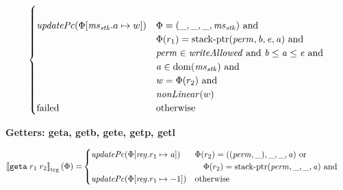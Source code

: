 \documentclass[a4paper]{article}
\newcommand{\sem}[1]{\left\llbracket #1 \right\rrbracket}
\newcommand{\tsem}[2][\Phi]{\sem{#2}_{\mathrm{trg}}(#1)}
\newcommand{\dom}{\mathrm{dom}}
\newcommand{\tand}{\text{ and }}
\newcommand{\totherwise}{\text{otherwise }}
\newcommand{\targetcolor}[1]{\color{black}}
\newcommand{\trg}[1]{{\targetcolor{} #1}}
\newcommand{\zinstr}[1]{\texttt{#1}}
\newcommand{\twoinstr}[3]{
  \ifthenelse{\equal{#2#3}{}}
  {\zinstr{#1}}
  {\zinstr{#1} \; #2 \; #3}
}
\newcommand{\tgeta}[2]{\twoinstr{\trg{geta}}{#1}{#2}}
\newcommand{\update}[2]{[#1 \mapsto #2]}
\newcommand{\updReg}[2]{\update{\reg.#1}{#2}}
\newcommand{\perm}{\var{perm}}
\newcommand{\stkptr}[1]{\mathrm{stack\text{-}ptr}(#1)}
\newcommand{\failed}{\mathrm{failed}}
\newcommand{\var}[1]{\mathit{#1}}
\newcommand{\reg}{\var{reg}}
\newcommand{\ms}{\var{ms}}
\newcommand{\stk}{\var{stk}}
\newcommand{\baddr}{\var{b}}
\newcommand{\eaddr}{\var{e}}
\newcommand{\aaddr}{\var{a}}
\newcommand{\plainfun}[2]{
  \ifthenelse{\equal{#2}{}}
  {\mathit{#1}}
  {\mathit{#1}(#2)}
}
\newcommand{\updPcAddr}[1]{\plainfun{updatePc}{#1}}
\newcommand{\writeAllowed}[1]{\plainfun{writeAllowed}{#1}}
\newcommand{\nonLinear}[1]{\plainfun{nonLinear}{#1}}
\begin{document}
\begin{align*}
\begin{cases}
\begin{array}[t]{l}
                                 \end{array} \\
                                 \updPcAddr{\Phi\update{\ms_\stk.a}{w}} & 
                                 \arraycolsep=0pt
                                 \begin{array}[t]{l}
                                   \Phi = (\_, \_, \_, \ms_\stk) \tand \\
                                   \Phi(r_1) = \stkptr{\perm,\baddr,\eaddr,\aaddr} \tand \\
                                   \perm \in \writeAllowed{} \tand \baddr \leq \aaddr \leq \eaddr \tand \\
                                   \aaddr \in \dom(\ms_\stk) \tand \\
                                   \var{w} = \Phi(r_2) \tand \\
                                   \nonLinear{w}
                                 \end{array} \\
                                 \failed & \totherwise
                               \end{cases}
\end{align*}

\textbf{Getters: geta, getb, gete, getp, getl}

\begin{align*}
  \tsem{\tgeta{r_1}{r_2}} = &
                              \begin{cases}
                                \updPcAddr{\Phi\update{\reg.r_1}{\aaddr}} & 
                                \arraycolsep=0pt
                                \begin{array}[t]{l}
                                  \Phi(r_2) = ((\perm,\_),\_,\_,\aaddr) \text{ or } \\
                                  \quad \Phi(r_2) = \stkptr{\perm,\_,\_,\aaddr} \tand\\
                                \end{array} \\
                                \updPcAddr{\Phi\updReg{r_1}{-1}} & \totherwise
                              \end{cases}
\end{align*}
\end{document}
